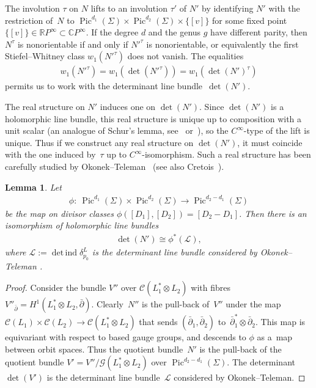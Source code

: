 \documentclass[10pt,a4paper]{amsart}
\numberwithin{equation}{section}
\newtheorem{Lemma}[Theorem]{Lemma}
\begin{document}
The involution $\tau$ on $N$ lifts to an involution $\tau'$ of $N'$ by identifying $N'$ with the restriction of~$N$ to $\operatorname{Pic}^{d_1}(\Sigma) \times \operatorname{Pic}^{d_2}(\Sigma) \times \{[v]\}$ for some f\/ixed point $\{[v]\} \in {\mathbb R} P^{\infty} \subset {\mathbb C} P^{\infty}$. If the degree $d$ and the genus $g$ have dif\/ferent parity, then $N^{\tau}$ is nonorientable if and only if $N'^{\tau}$ is nonorientable, or equivalently the f\/irst Stiefel--Whitney class $w_1(N'^{\tau})$ does not vanish. The equalities{\samepage \begin{gather*}w_1(N'^{\tau}) = w_1(\det(N'^{\tau})) = w_1(\det(N')^{\tau})\end{gather*} permits us to work with the determinant line bundle~$\det(N')$.}

The real structure on $N'$ induces one on $\det(N')$. Since $\det(N')$ is a holomorphic line bundle, this real structure is unique up to composition with a unit scalar (an analogue of Schur's lemma, see~\cite{BHH} or~\cite{OT}), so the $C^{\infty}$-type of the lift is unique. Thus if we construct any real structure on $\det(N')$, it must coincide with the one induced by~$\tau$ up to $C^{\infty}$-isomorphism. Such a real structure has been carefully studied by Okonek--Teleman~\cite{OT} (see also Cretois~\cite{C}).

\begin{Lemma}\label{themapphi}
Let
\begin{gather*}\phi\colon \ \operatorname{Pic}^{d_1}(\Sigma) \times \operatorname{Pic}^{d_2}(\Sigma) \rightarrow \operatorname{Pic}^{d_2-d_1}(\Sigma)\end{gather*}
be the map on divisor classes $ \phi([D_1], [D_2]) = [D_2-D_1]$. Then there is an isomorphism of holomorphic line bundles \begin{gather*} \det(N') \cong \phi^*( {\mathcal L}), \end{gather*}
where ${\mathcal L} := \operatorname{det \, ind} \delta_{p_0}^L$ is the determinant line bundle considered by Okonek--Teleman {\rm \cite[Section~1]{OT}}.
\end{Lemma}


\begin{proof}
Consider the bundle $V''$ over ${\mathcal C}(L_1^*\otimes L_2)$ with f\/ibres $V''_{\bar{\partial}} = H^1(L_1^* \otimes L_2, \bar{\partial})$. Clearly~$N''$ is the pull-back of~$V''$ under the map ${\mathcal C}(L_1) \times {\mathcal C}(L_2) \rightarrow {\mathcal C}(L_1^* \otimes L_2)$ that sends $(\bar{\partial}_1, \bar{\partial}_2)$ to~$\bar{\partial}_1^*\otimes \bar{\partial}_2$. This map is equivariant with respect to based gauge groups, and descends to $\phi$ as a~map between orbit spaces. Thus the quotient bundle~$N'$ is the pull-back of the quotient bundle $V' = V''/ {\mathcal G}(L_1^* \otimes L_2)$ over $\operatorname{Pic}^{d_2-d_1}(\Sigma)$. The determinant~$\det(V')$ is the determinant line bundle~${\mathcal L}$ considered by Okonek--Teleman.
\end{proof}
\end{document}
